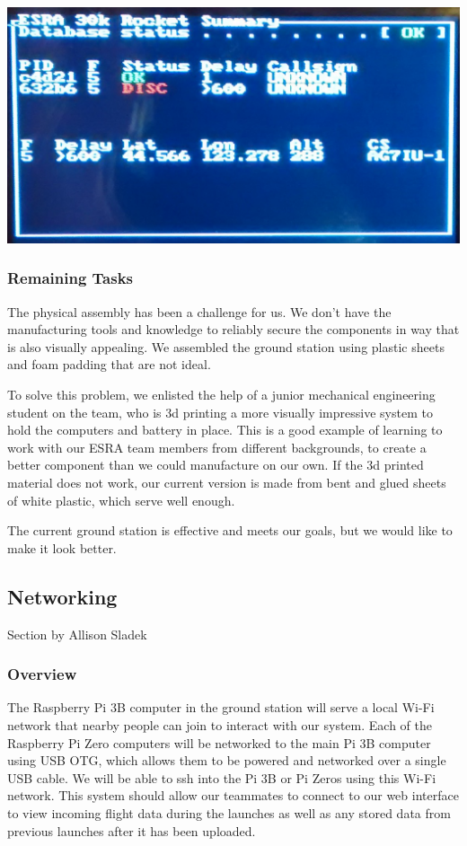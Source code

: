 \documentclass[onecolumn, draftclsnofoot, 10pt, compsoc]{IEEEtran}
\begin{document}
\begin{center}
	\includegraphics[width=.5\textwidth]{images/monitor.eps}
    \label{gs-monitor}
\end{center}

\subsubsection{Remaining Tasks}
The physical assembly has been a challenge for us.  We don't have the manufacturing tools and knowledge to reliably secure the components in way that is also visually appealing.  We assembled the ground station using plastic sheets and foam padding that are not ideal.

To solve this problem, we enlisted the help of a junior mechanical engineering student on the team, who is 3d printing a more visually impressive system to hold the computers and battery in place.  This is a good example of learning to work with our ESRA team members from different backgrounds, to create a better component than we could manufacture on our own.  If the 3d printed material does not work, our current version is made from bent and glued sheets of white plastic, which serve well enough.

The current ground station is effective and meets our goals, but we would like to make it look better.


\subsection{Networking}
Section by Allison Sladek

\subsubsection{Overview}
The Raspberry Pi 3B computer in the ground station will serve a local Wi-Fi network that nearby people can join to interact with our system.
Each of the Raspberry Pi Zero computers will be networked to the main Pi 3B computer using USB OTG, which allows them to be powered and networked over a single USB cable.
We will be able to ssh into the Pi 3B or Pi Zeros using this Wi-Fi network.
This system should allow our teammates to connect to our web interface to view incoming flight data during the launches as well as any stored data from previous launches after it has been uploaded.
\end{document}
